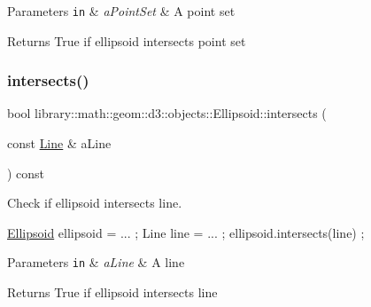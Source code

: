 \begin{DoxyParams}[1]{Parameters}
\mbox{\tt in}  & {\em a\+Point\+Set} & A point set \\
\hline
\end{DoxyParams}
\begin{DoxyReturn}{Returns}
True if ellipsoid intersects point set 
\end{DoxyReturn}
\mbox{\label{classlibrary_1_1math_1_1geom_1_1d3_1_1objects_1_1_ellipsoid_a50957c46fca340a2d20e1845f97f9131}} 
\subsubsection{\texorpdfstring{intersects()}{intersects()}\hspace{0.1cm}{\footnotesize\ttfamily [3/10]}}
{\footnotesize\ttfamily bool library\+::math\+::geom\+::d3\+::objects\+::\+Ellipsoid\+::intersects (\begin{DoxyParamCaption}\item[{const \hyperlink{classlibrary_1_1math_1_1geom_1_1d3_1_1objects_1_1_line}{Line} \&}]{a\+Line }\end{DoxyParamCaption}) const}



Check if ellipsoid intersects line. 


\begin{DoxyCode}
\hyperlink{classlibrary_1_1math_1_1geom_1_1d3_1_1objects_1_1_ellipsoid_aae81fe0edc7f0e8d4590ea89ae73cb14}{Ellipsoid} ellipsoid = ... ;
Line line = ... ;
ellipsoid.intersects(line) ;
\end{DoxyCode}



\begin{DoxyParams}[1]{Parameters}
\mbox{\tt in}  & {\em a\+Line} & A line \\
\hline
\end{DoxyParams}
\begin{DoxyReturn}{Returns}
True if ellipsoid intersects line 
\end{DoxyReturn}
\mbox{\label{classlibrary_1_1math_1_1geom_1_1d3_1_1objects_1_1_ellipsoid_a8346f54be39644c22a5a8728ac368832}} 
